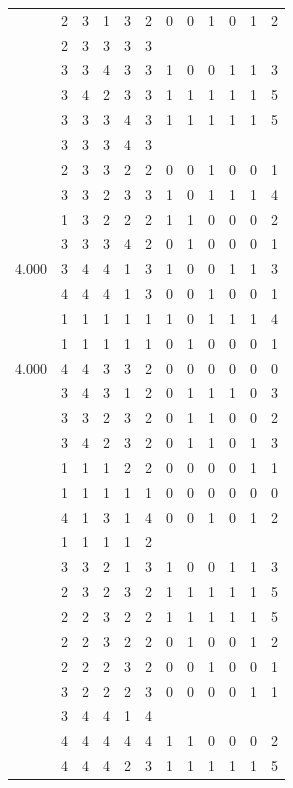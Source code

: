 \documentclass[]{book}
\theoremstyle{definition}
\theoremstyle{definition}
\theoremstyle{definition}
\theoremstyle{remark}
\begin{document}
\begin{table}
{\begin{tabular}[t]{rrrrrrrrrrrr}
 & 2 & 3 & 1 & 3 & 2 & 0 & 0 & 1 & 0 & 1 & 2\\
 & 2 & 3 & 3 & 3 & 3 &  &  &  &  &  & \\
 & 3 & 3 & 4 & 3 & 3 & 1 & 0 & 0 & 1 & 1 & 3\\
 & 3 & 4 & 2 & 3 & 3 & 1 & 1 & 1 & 1 & 1 & 5\\
 & 3 & 3 & 3 & 4 & 3 & 1 & 1 & 1 & 1 & 1 & 5\\
 & 3 & 3 & 3 & 4 & 3 &  &  &  &  &  & \\
 & 2 & 3 & 3 & 2 & 2 & 0 & 0 & 1 & 0 & 0 & 1\\
 & 3 & 3 & 2 & 3 & 3 & 1 & 0 & 1 & 1 & 1 & 4\\
 & 1 & 3 & 2 & 2 & 2 & 1 & 1 & 0 & 0 & 0 & 2\\
 & 3 & 3 & 3 & 4 & 2 & 0 & 1 & 0 & 0 & 0 & 1\\
4.000 & 3 & 4 & 4 & 1 & 3 & 1 & 0 & 0 & 1 & 1 & 3\\
 & 4 & 4 & 4 & 1 & 3 & 0 & 0 & 1 & 0 & 0 & 1\\
 & 1 & 1 & 1 & 1 & 1 & 1 & 0 & 1 & 1 & 1 & 4\\
 & 1 & 1 & 1 & 1 & 1 & 0 & 1 & 0 & 0 & 0 & 1\\
4.000 & 4 & 4 & 3 & 3 & 2 & 0 & 0 & 0 & 0 & 0 & 0\\
 & 3 & 4 & 3 & 1 & 2 & 0 & 1 & 1 & 1 & 0 & 3\\
 & 3 & 3 & 2 & 3 & 2 & 0 & 1 & 1 & 0 & 0 & 2\\
 & 3 & 4 & 2 & 3 & 2 & 0 & 1 & 1 & 0 & 1 & 3\\
 & 1 & 1 & 1 & 2 & 2 & 0 & 0 & 0 & 0 & 1 & 1\\
 & 1 & 1 & 1 & 1 & 1 & 0 & 0 & 0 & 0 & 0 & 0\\
 & 4 & 1 & 3 & 1 & 4 & 0 & 0 & 1 & 0 & 1 & 2\\
 & 1 & 1 & 1 & 1 & 2 &  &  &  &  &  & \\
 & 3 & 3 & 2 & 1 & 3 & 1 & 0 & 0 & 1 & 1 & 3\\
 & 2 & 3 & 2 & 3 & 2 & 1 & 1 & 1 & 1 & 1 & 5\\
 & 2 & 2 & 3 & 2 & 2 & 1 & 1 & 1 & 1 & 1 & 5\\
 & 2 & 2 & 3 & 2 & 2 & 0 & 1 & 0 & 0 & 1 & 2\\
 & 2 & 2 & 2 & 3 & 2 & 0 & 0 & 1 & 0 & 0 & 1\\
 & 3 & 2 & 2 & 2 & 3 & 0 & 0 & 0 & 0 & 1 & 1\\
 & 3 & 4 & 4 & 1 & 4 &  &  &  &  &  & \\
 & 4 & 4 & 4 & 4 & 4 & 1 & 1 & 0 & 0 & 0 & 2\\
 & 4 & 4 & 4 & 2 & 3 & 1 & 1 & 1 & 1 & 1 & 5\\

\end{tabular}}
\end{table}
\end{document}
